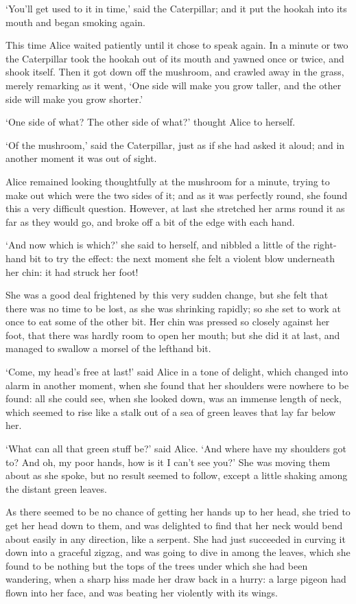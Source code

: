 \documentclass[statementpaper,twoside,openany]{memoir}
\begin{document}
`You'll get used to it in time,' said the Caterpillar; and it put the hookah into its mouth and began smoking again.

This time Alice waited patiently until it chose to speak again. In a minute or two the Caterpillar took the hookah out of its mouth and yawned once or twice, and shook itself. Then it got down off the mushroom, and crawled away in the grass, merely remarking as it went, `One side will make you grow taller, and the other side will make you grow shorter.'

`One side of what? The other side of what?' thought Alice to herself.

`Of the mushroom,' said the Caterpillar, just as if she had asked it aloud; and in another moment it was out of sight.

Alice remained looking thoughtfully at the mushroom for a minute, trying to make out which were the two sides of it; and as it was perfectly round, she found this a very difficult question. However, at last she stretched her arms round it as far as they would go, and broke off a bit of the edge with each hand.

`And now which is which?' she said to herself, and nibbled a little of the right-hand bit to try the effect: the next moment she felt a violent blow underneath her chin: it had struck her foot!

She was a good deal frightened by this very sudden change, but she felt that there was no time to be lost, as she was shrinking rapidly; so she set to work at once to eat some of the other bit. Her chin was pressed so closely against her foot, that there was hardly room to open her mouth; but she did it at last, and managed to swallow a morsel of the lefthand bit.

`Come, my head's free at last!' said Alice in a tone of delight, which changed into alarm in another moment, when she found that her shoulders were nowhere to be found: all she could see, when she looked down, was an immense length of neck, which seemed to rise like a stalk out of a sea of green leaves that lay far below her.

`What can all that green stuff be?' said Alice. `And where have my shoulders got to? And oh, my poor hands, how is it I can't see you?' She was moving them about as she spoke, but no result seemed to follow, except a little shaking among the distant green leaves.

As there seemed to be no chance of getting her hands up to her head, she tried to get her head down to them, and was delighted to find that her neck would bend about easily in any direction, like a serpent. She had just succeeded in curving it down into a graceful zigzag, and was going to dive in among the leaves, which she found to be nothing but the tops of the trees under which she had been wandering, when a sharp hiss made her draw back in a hurry: a large pigeon had flown into her face, and was beating her violently with its wings.
\end{document}
